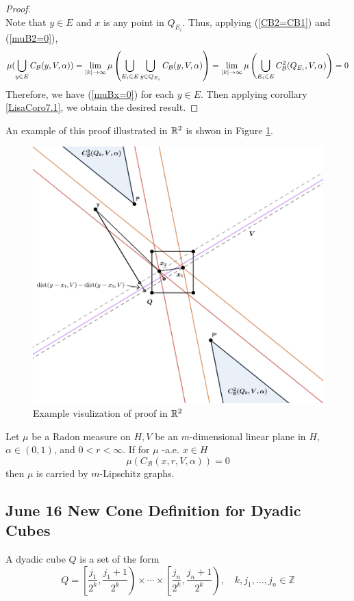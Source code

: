\begin{proof}
\begin{equation}
\end{equation}
Note that $y\in E$ and $x$ is any point in $Q_{E_i}$. Thus, applying (\ref{CB2=CB1}) and (\ref{muB2=0}), 
\begin{equation*}
    \begin{split}
        \mu(\bigcup_{y\in E}C_\mathcal B(y, V, \alpha))
        = \lim_{|k|\rightarrow \infty}\mu\left( \bigcup_{E_i\in E}\bigcup_{y\in Q_{E_i}} C_\mathcal B(y, V, \alpha) \right)  
        = \lim_{|k|\rightarrow\infty}\mu\left( \bigcup_{E_i\in E} C_\mathcal B^2(Q_{E_i}, V, \alpha) \right)
        = 0
    \end{split}
\end{equation*}
Therefore, we have (\ref{muBx=0}) for each $y\in E$. Then applying corollary \ref{LisaCoro7.1}, we obtain the desired result. 
\end{proof}



An example of this proof illustrated in $\mathbb{R}^2$ is shwon in Figure \ref{fig:CB1=CB2}.

\begin{figure}[H]
    \centering
    \includegraphics[width=.6\textwidth]{images/CB1=CB2.png}
    \caption{Example visulization of proof in $\mathbb{R}^2$}
    \label{fig:CB1=CB2}
\end{figure}


\begin{corollary}\label{LisaCoro7.1}
    Let $\mu$ be a Radon measure on $H, V$ be an $m$-dimensional linear plane in $H$, $\alpha \in(0,1)$, and $0<r<\infty$. If for $\mu$ -a.e. $x \in H$
   $$
   \mu\left(C_{\mathcal{B}}(x, r, V, \alpha)\right)=0
   $$
   then $\mu$ is carried by $m$-Lipschitz graphs.
\end{corollary}




\newpage
\subsection{June 16 New Cone Definition for Dyadic Cubes}
\begin{definition} A dyadic cube $Q$ is a set of the form
    \begin{equation}\label{equ:dyadiccube}
        Q=\left[\frac{j_{1}}{2^{k}}, \frac{j_{1}+1}{2^{k}}\right) \times \cdots \times\left[\frac{j_{n}}{2^{k}}, \frac{j_{n}+1}{2^{k}}\right), \quad k, j_{1}, \ldots, j_{n} \in \mathbb{Z}
    \end{equation}
\end{definition}

